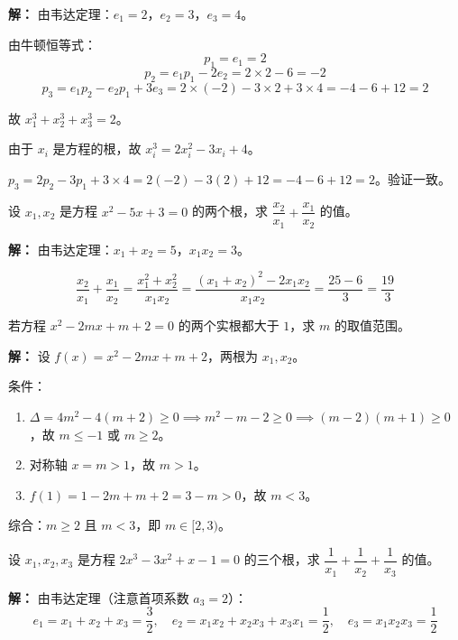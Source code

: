 \documentclass[12pt, a4paper]{ctexart}
\begin{document}
\textbf{解：} 由韦达定理：$e_1 = 2$，$e_2 = 3$，$e_3 = 4$。

由牛顿恒等式：
\[
p_1 = e_1 = 2
\]
\[
p_2 = e_1 p_1 - 2e_2 = 2 \times 2 - 6 = -2
\]
\[
p_3 = e_1 p_2 - e_2 p_1 + 3e_3 = 2 \times (-2) - 3 \times 2 + 3 \times 4 = -4 - 6 + 12 = 2
\]

故 $x_1^3 + x_2^3 + x_3^3 = 2$。

\begin{tipbox}[验证方法]
由于 $x_i$ 是方程的根，故 $x_i^3 = 2x_i^2 - 3x_i + 4$。

$p_3 = 2p_2 - 3p_1 + 3 \times 4 = 2(-2) - 3(2) + 12 = -4-6+12=2$。验证一致。
\end{tipbox}

\begin{examplebox}[【例题5】对称多项式求值]
设 $x_1, x_2$ 是方程 $x^2 - 5x + 3 = 0$ 的两个根，求 $\dfrac{x_2}{x_1} + \dfrac{x_1}{x_2}$ 的值。
\end{examplebox}

\textbf{解：} 由韦达定理：$x_1+x_2=5$，$x_1 x_2=3$。

\[
\frac{x_2}{x_1} + \frac{x_1}{x_2} = \frac{x_1^2+x_2^2}{x_1 x_2} = \frac{(x_1+x_2)^2 - 2x_1x_2}{x_1 x_2} = \frac{25-6}{3} = \frac{19}{3}
\]

\begin{examplebox}[【例题6】根的分布问题]
若方程 $x^2 - 2mx + m + 2 = 0$ 的两个实根都大于 $1$，求 $m$ 的取值范围。
\end{examplebox}

\textbf{解：} 设 $f(x) = x^2 - 2mx + m + 2$，两根为 $x_1, x_2$。

条件：
\begin{enumerate}[label=(\arabic*)]
\item $\Delta = 4m^2 - 4(m+2) \geq 0 \implies m^2 - m - 2 \geq 0 \implies (m-2)(m+1) \geq 0$，故 $m \leq -1$ 或 $m \geq 2$。
\item 对称轴 $x = m > 1$，故 $m > 1$。
\item $f(1) = 1 - 2m + m + 2 = 3 - m > 0$，故 $m < 3$。
\end{enumerate}

综合：$m \geq 2$ 且 $m < 3$，即 $m \in [2, 3)$。

\begin{examplebox}[【例题7】三次方程韦达定理求对称式]
设 $x_1, x_2, x_3$ 是方程 $2x^3 - 3x^2 + x - 1 = 0$ 的三个根，求 $\dfrac{1}{x_1} + \dfrac{1}{x_2} + \dfrac{1}{x_3}$ 的值。
\end{examplebox}

\textbf{解：} 由韦达定理（注意首项系数 $a_3 = 2$）：
\[
e_1 = x_1+x_2+x_3 = \frac{3}{2},\quad e_2 = x_1x_2+x_2x_3+x_3x_1 = \frac{1}{2},\quad e_3 = x_1x_2x_3 = \frac{1}{2}
\]
\end{document}
